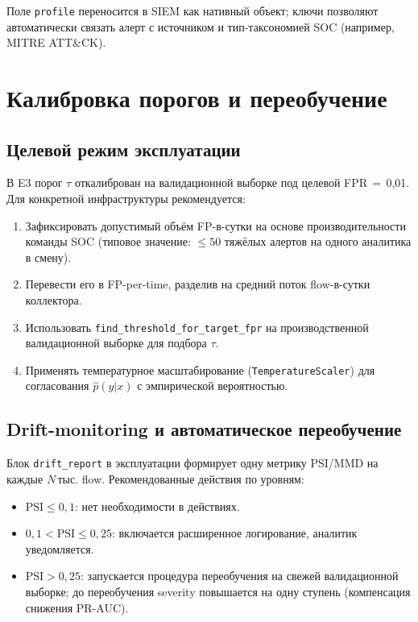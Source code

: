 \documentclass[14pt, a4paper]{extarticle}
\begin{document}
Поле \texttt{profile} переносится в SIEM как нативный объект; ключи
позволяют автоматически связать алерт с источником и тип-таксономией
SOC (например, MITRE ATT\&CK\cite{mitreattack}).

\section{Калибровка порогов и переобучение}

\subsection{Целевой режим эксплуатации}

В E3 порог \(\tau\) откалиброван на валидационной выборке под
целевой FPR\,$=$\,0{,}01. Для конкретной инфраструктуры рекомендуется:

\begin{enumerate}
    \item Зафиксировать допустимый объём FP-в-сутки на основе
    производительности команды SOC (типовое значение:
    \(\leq 50\) тяжёлых алертов на одного аналитика в смену).
    \item Перевести его в FP-per-time, разделив на средний поток
    flow-в-сутки коллектора.
    \item Использовать \texttt{find\_threshold\_for\_target\_fpr} на
    производственной валидационной выборке для подбора \(\tau\).
    \item Применять температурное масштабирование
    (\texttt{TemperatureScaler}) для согласования \(\hat{p}(y|x)\) с
    эмпирической вероятностью.
\end{enumerate}

\subsection{Drift-monitoring и автоматическое переобучение}

Блок \texttt{drift\_report} в эксплуатации формирует одну метрику
PSI/MMD на каждые \(N\)\,тыс. flow. Рекомендованные действия по уровням:

\begin{itemize}
    \item \(\text{PSI} \le 0{,}1\): нет необходимости в действиях.
    \item \(0{,}1 < \text{PSI} \le 0{,}25\): включается расширенное
    логирование, аналитик уведомляется.
    \item \(\text{PSI} > 0{,}25\): запускается процедура
    переобучения на свежей валидационной выборке; до переобучения
    severity повышается на одну ступень (компенсация снижения PR-AUC).
\end{itemize}
\end{document}
